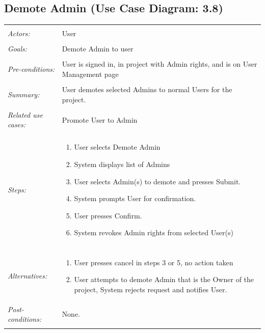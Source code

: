 \documentclass[11pt]{report}
\begin{document}
\subsection{Demote Admin (Use Case Diagram: 3.8)}
\begin{tabular}{ p{2cm} p{12cm} }
    \hline
    \\
    \textit{Actors:} & User \\ 
    \\
    \textit{Goals:} & Demote Admin to user \\
    \\
    \textit{Pre-conditions:} & User is signed in, in project with Admin rights, and is on User Management page \\
    \\
    \textit{Summary:} & User demotes selected Admins to normal Users for the project. \\ 
    \\
    \textit{Related use cases:} & Promote User to Admin \\ 
    \\
    \textit{Steps:} & \begin{enumerate}
        \item User selects Demote Admin
        \item System displays list of Admins
        \item User selects Admin(s) to demote and presses Submit.
        \item System prompts User for confirmation.
        \item User presses Confirm.
        \item System revokes Admin rights from selected User(s)
    \end{enumerate} \\
    \\
    \textit{Alternatives:} & \begin{enumerate}
        \item User presses cancel in steps 3 or 5, no action taken
        \item User attempts to demote Admin that is the Owner of the project, System rejects request and notifies User.
    \end{enumerate}
    \\
    \textit{Post-conditions:} & None. \\
    \\
    \hline
\end{tabular}
\end{document}
